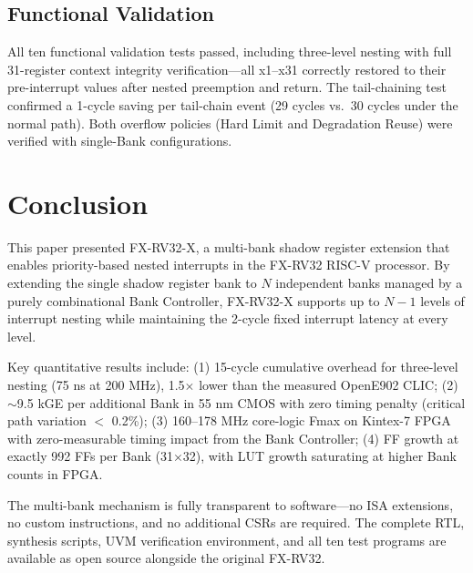 \documentclass[conference]{IEEEtran}
\begin{document}
\subsection{Functional Validation}

All ten functional validation tests passed, including three-level nesting with full 31-register context integrity verification---all x1--x31 correctly restored to their pre-interrupt values after nested preemption and return.
The tail-chaining test confirmed a 1-cycle saving per tail-chain event (29 cycles vs.\ 30 cycles under the normal path).
Both overflow policies (Hard Limit and Degradation Reuse) were verified with single-Bank configurations.

\section{Conclusion}

This paper presented FX-RV32-X, a multi-bank shadow register extension that enables priority-based nested interrupts in the FX-RV32 RISC-V processor.
By extending the single shadow register bank to $N$ independent banks managed by a purely combinational Bank Controller, FX-RV32-X supports up to $N-1$ levels of interrupt nesting while maintaining the 2-cycle fixed interrupt latency at every level.

Key quantitative results include: (1) 15-cycle cumulative overhead for three-level nesting (75 ns at 200 MHz), 1.5$\times$ lower than the measured OpenE902 CLIC; (2) $\sim$9.5 kGE per additional Bank in 55 nm CMOS with zero timing penalty (critical path variation $<$ 0.2\%); (3) 160--178 MHz core-logic Fmax on Kintex-7 FPGA with zero-measurable timing impact from the Bank Controller; (4) FF growth at exactly 992 FFs per Bank (31$\times$32), with LUT growth saturating at higher Bank counts in FPGA.

The multi-bank mechanism is fully transparent to software---no ISA extensions, no custom instructions, and no additional CSRs are required.
The complete RTL, synthesis scripts, UVM verification environment, and all ten test programs are available as open source alongside the original FX-RV32.
\end{document}
